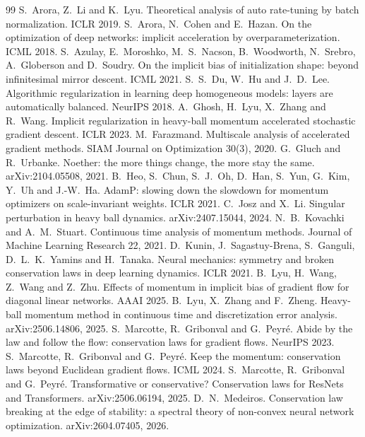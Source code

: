 \documentclass[11pt]{article}
\theoremstyle{remark}
\theoremstyle{definition}
\begin{document}
\begin{thebibliography}{99}
 S.~Arora, Z.~Li and K.~Lyu. Theoretical analysis of auto rate-tuning by batch normalization. ICLR 2019.
 S.~Arora, N.~Cohen and E.~Hazan. On the optimization of deep networks: implicit acceleration by overparameterization. ICML 2018.
 S.~Azulay, E.~Moroshko, M.~S.~Nacson, B.~Woodworth, N.~Srebro, A.~Globerson and D.~Soudry. On the implicit bias of initialization shape: beyond infinitesimal mirror descent. ICML 2021.
 S.~S.~Du, W.~Hu and J.~D.~Lee. Algorithmic regularization in learning deep homogeneous models: layers are automatically balanced. NeurIPS 2018.
 A.~Ghosh, H.~Lyu, X.~Zhang and R.~Wang. Implicit regularization in heavy-ball momentum accelerated stochastic gradient descent. ICLR 2023.
 M.~Farazmand. Multiscale analysis of accelerated gradient methods. SIAM Journal on Optimization 30(3), 2020.
 G.~Gluch and R.~Urbanke. Noether: the more things change, the more stay the same. arXiv:2104.05508, 2021.
 B.~Heo, S.~Chun, S.~J.~Oh, D.~Han, S.~Yun, G.~Kim, Y.~Uh and J.-W.~Ha. AdamP: slowing down the slowdown for momentum optimizers on scale-invariant weights. ICLR 2021.
 C.~Josz and X.~Li. Singular perturbation in heavy ball dynamics. arXiv:2407.15044, 2024.
 N.~B.~Kovachki and A.~M.~Stuart. Continuous time analysis of momentum methods. Journal of Machine Learning Research 22, 2021.
 D.~Kunin, J.~Sagastuy-Brena, S.~Ganguli, D.~L.~K.~Yamins and H.~Tanaka. Neural mechanics: symmetry and broken conservation laws in deep learning dynamics. ICLR 2021.
 B.~Lyu, H.~Wang, Z.~Wang and Z.~Zhu. Effects of momentum in implicit bias of gradient flow for diagonal linear networks. AAAI 2025.
 B.~Lyu, X.~Zhang and F.~Zheng. Heavy-ball momentum method in continuous time and discretization error analysis. arXiv:2506.14806, 2025.
 S.~Marcotte, R.~Gribonval and G.~Peyr\'e. Abide by the law and follow the flow: conservation laws for gradient flows. NeurIPS 2023.
 S.~Marcotte, R.~Gribonval and G.~Peyr\'e. Keep the momentum: conservation laws beyond Euclidean gradient flows. ICML 2024.
 S.~Marcotte, R.~Gribonval and G.~Peyr\'e. Transformative or conservative? Conservation laws for ResNets and Transformers. arXiv:2506.06194, 2025.
 D.~N.~Medeiros. Conservation law breaking at the edge of stability: a spectral theory of non-convex neural network optimization. arXiv:2604.07405, 2026.

\end{thebibliography}
\end{document}
